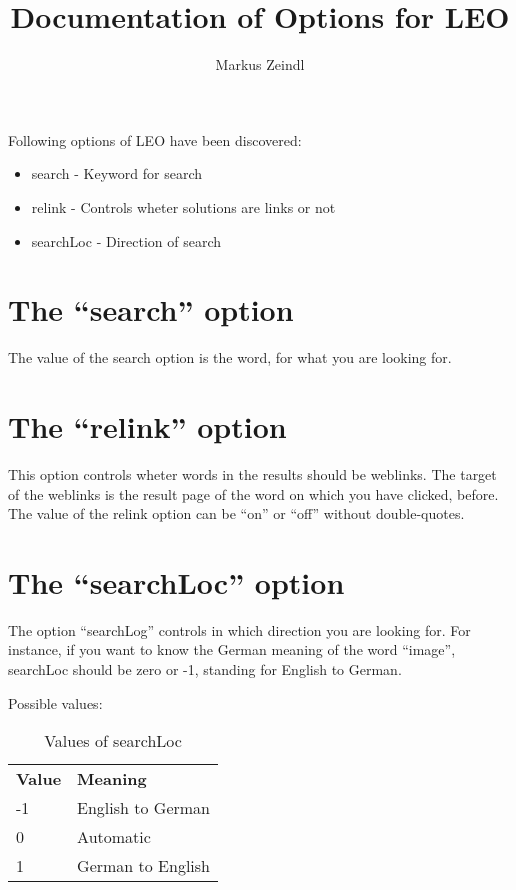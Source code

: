 \documentclass{article}
\title{Documentation of Options for LEO}
\author{Markus Zeindl}
\begin{document}
\maketitle
Following options of LEO have been discovered:
\begin{itemize}
\item{search - Keyword for search}
\item{relink - Controls wheter solutions are links or not}
\item{searchLoc - Direction of search}
\end{itemize}

\section{The ``search'' option}

The value of the search option is the word, for what you are looking for.

\section{The ``relink'' option}

This option controls wheter words in the results should be weblinks. The target of the weblinks is the result page of the word on which you have clicked, before.\\
The value of the relink option can be ``on'' or ``off'' without double-quotes.

\section{The ``searchLoc'' option}

The option ``searchLog'' controls in which direction you are looking for. For instance, if you want to know the German meaning of the word ``image'', searchLoc should be zero or -1, standing for English to German.

Possible values:
\begin{table}
  \centering
  \begin{tabular}{|l|l|}

    \textbf{Value} & \textbf{Meaning}\\
   -1     & English to German\\
    0     & Automatic\\
    1     & German to English\\
  \end{tabular}
  \caption{Values of searchLoc}
\end{table}
\end{document}
